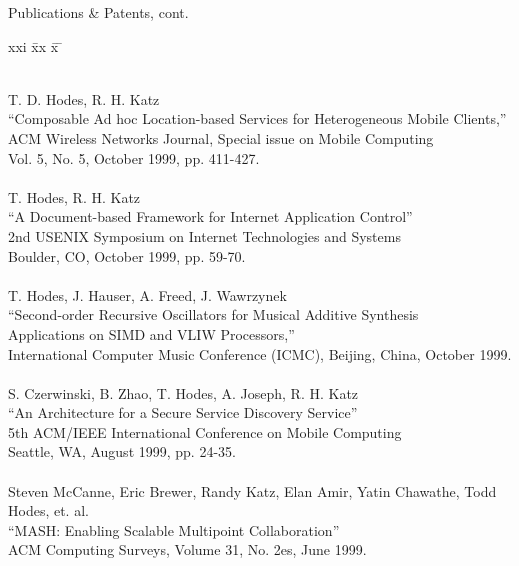 \newpage
\begin{bf} \large
Publications \& Patents, cont.
\end{bf}
\begin{tabbing}
xxi \= xx \= x \= \kill

\smallskip \\[-3pt]
\>    T. D. Hodes, R. H. Katz \\
\>\>      ``Composable Ad hoc Location-based Services for Heterogeneous
             Mobile Clients,'' \\
\>\>       ACM Wireless Networks Journal, Special issue on Mobile Computing \\
\>\>       Vol. 5, No. 5, October 1999, pp. 411-427. \\
\smallskip \\[-3pt]
\>    T. Hodes, R. H. Katz \\
\>\>      ``A Document-based Framework for Internet Application Control'' \\
\>\>       2nd USENIX Symposium on Internet Technologies and Systems \\
\>\>       Boulder, CO, October 1999, pp. 59-70. \\
\smallskip \\[-3pt]
\>    T. Hodes, J. Hauser, A. Freed, J. Wawrzynek\\
\>\>      ``Second-order Recursive Oscillators for Musical Additive Synthesis \\
\>\>\>        Applications on SIMD and VLIW Processors,'' \\
\>\>       International Computer Music Conference (ICMC), Beijing, China, October 1999. \\
\smallskip \\[-3pt]
\>    S. Czerwinski, B. Zhao, T. Hodes, A. Joseph, R. H. Katz \\
\>\>      ``An Architecture for a Secure Service Discovery Service'' \\
\>\>       5th ACM/IEEE International Conference on Mobile Computing \\
\>\>       Seattle, WA, August 1999, pp. 24-35. \\
\smallskip \\[-3pt]
\>    Steven McCanne, Eric Brewer, Randy Katz, Elan Amir, Yatin Chawathe,
    Todd Hodes, et. al. \\
\>\>      ``MASH: Enabling Scalable Multipoint Collaboration'' \\
\>\>       ACM Computing Surveys, Volume 31, No. 2es, June 1999. \\

\end{tabbing}
